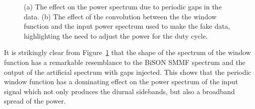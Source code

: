 \begin{figure}[ht!]
	\centering
	\qquad
	\caption{(a) The effect on the power spectrum due to periodic gaps in the data. (b) The effect of the convolution between the the window function and the input power spectrum used to make the fake data, highlighting the need to adjust the power for the duty cycle.}
	\label{fig:window_function_PSDs}
\end{figure}


It is strikingly clear from Figure~\ref{fig:window_function_PSDs} that the shape of the spectrum of the window function has a remarkable resemblance to the BiSON SMMF spectrum and the output of the artificial spectrum with gaps injected. This shows that the periodic window function has a dominating effect on the power spectrum of the input signal which not only produces the diurnal sidebands, but also a broadband spread of the power.

